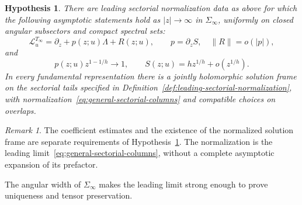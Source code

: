 \documentclass[11pt,leqno]{amsart}
\numberwithin{equation}{section}
\theoremstyle{plain}
\theoremstyle{definition}
\theoremstyle{plain}
\newtheorem{hypothesis}{Hypothesis}
\theoremstyle{definition}
\theoremstyle{remark}
\newtheorem{remark}[theorem]{Remark}
\begin{document}
\begin{hypothesis}\label{hyp:subdominant}
There are leading sectorial normalization data as above for which the following asymptotic statements hold as $|z|\to\infty$ in $\Sigma_\infty$, uniformly on closed angular subsectors and compact spectral sets:
\begin{equation}\label{eq:general-irregular-normal-form}
 \mathcal L_u^{T_\infty}=\partial_z+p(z;u)\Lambda+R(z;u),
 \qquad p=\partial_zS,\quad \|R\|=o(|p|),
\end{equation}
and
\begin{equation}\label{eq:abstract-principal-asymptotic-type}
 p(z;u)z^{1-1/h}\longrightarrow1,\qquad
 S(z;u)=hz^{1/h}+o(z^{1/h}).
\end{equation}
In every fundamental representation there is a jointly holomorphic solution frame on the sectorial tails specified in Definition~\ref{def:leading-sectorial-normalization}, with normalization~\eqref{eq:general-sectorial-columns} and compatible choices on overlaps.
\end{hypothesis}

\begin{remark}\label{rem:leading-normalization-scope}
The coefficient estimates and the existence of the normalized solution frame are separate requirements of Hypothesis~\ref{hyp:subdominant}.  The normalization is the leading limit~\eqref{eq:general-sectorial-columns}, without a complete asymptotic expansion of its prefactor.
\end{remark}

The angular width of $\Sigma_\infty$ makes the leading limit strong enough to prove uniqueness and tensor preservation.
\end{document}
